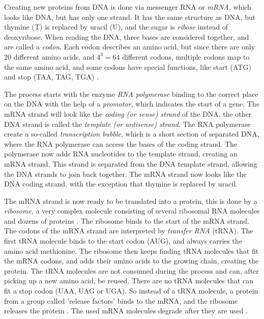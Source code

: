\documentclass[../main/thesis.tex]{subfiles}
\begin{document}

Creating new proteins from DNA is done via messenger RNA or \textit{mRNA}, which looks like DNA, but has only one strand.
It has the same structure as DNA, but thymine (T) is replaced by uracil (U), and the sugar is \textit{ribose} instead of deoxyribose.
When reading the DNA, three bases are considered together, and are called a \textit{codon}.
Each codon describes an amino acid, but since there are only 20 different amino acids, and $4^3=64$ different codons, multiple codons map to the same amino acid, and some codons have special functions, like start (ATG) and stop (TAA, TAG, TGA) \cite{codons}.

The process starts with the enzyme \textit{RNA polymerase} binding to the correct place on the DNA with the help of a \textit{promotor}, which indicates the start of a gene.
The mRNA strand will look like the \textit{coding (or sense) strand} of the DNA, the other DNA strand is called the \textit{template (or antisense) strand}.
The RNA polymerase create a so-called \textit{transcription bubble}, which is a short section of separated DNA, where the RNA polymerase can access the bases of the coding strand.
The polymerase now adds RNA nucleotides to the template strand, creating an mRNA strand.
This strand is separated from the DNA template strand, allowing the DNA strands to join back together.
The mRNA strand now looks like the DNA coding strand, with the exception that thymine is replaced by uracil.

The mRNA strand is now ready to be translated into a protein, this is done by a \textit{ribosome}, a very complex molecule consisting of several ribosomal RNA molecules and dozens of proteins \cite{DNA_translation1}.
The ribosome binds to the start of the mRNA strand.
The codons of the mRNA strand are interpreted by \textit{transfer RNA} (tRNA).
The first tRNA molecule binds to the start codon (AUG), and always carries the amino acid methionine.
The ribosome then keeps finding tRNA molecules that fit the mRNA codons, and adds their amino acids to the growing chain, creating the protein.
The tRNA molecules are not consumed during the process and can, after picking up a new amino acid, be reused.
There are no tRNA molecules that can fit a stop codon (UAA, UAG or UGA).
So instead of a tRNA molecule, a protein from a group called 'release factors' binds to the mRNA, and the ribosome releases the protein \cite{DNA_translation2}.
The used mRNA molecules degrade after they are used \cite{mRNA_degradation}.
\end{document}

